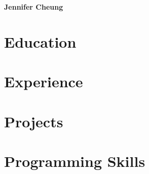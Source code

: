 \documentclass[letterpaper,11pt]{article}
\begin{document}
\begin{center}
    \textbf{\huge Jennifer Cheung}
    \\
    
\end{center}


\section*{Education}



\section*{Experience}



\section*{Projects}



\section*{Programming Skills}
\end{document}

